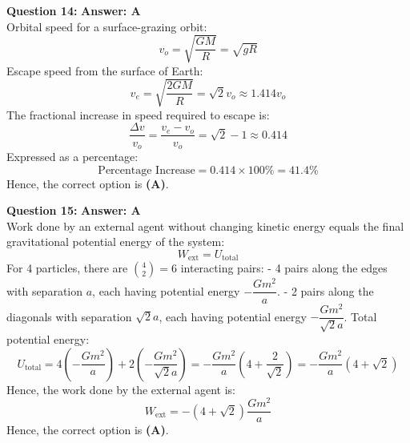 \documentclass[11pt,a4paper]{article}
\begin{document}
\begin{tcolorbox}[solbox]
  \textbf{\textcolor{primaryDark}{Question 14:}} \hfill \textbf{\textcolor{l1Green}{Answer: A}}\\
  \vspace{3pt}
  Orbital speed for a surface-grazing orbit:
$$v_o = \sqrt{\frac{GM}{R}} = \sqrt{gR}$$
\vspace{3pt}
Escape speed from the surface of Earth:
$$v_e = \sqrt{\frac{2GM}{R}} = \sqrt{2} v_o \approx 1.414 v_o$$
\vspace{3pt}
The fractional increase in speed required to escape is:
$$\frac{\Delta v}{v_o} = \frac{v_e - v_o}{v_o} = \sqrt{2} - 1 \approx 0.414$$
\vspace{3pt}
Expressed as a percentage:
$$\text{Percentage Increase} = 0.414 \times 100\% = 41.4\%$$
\vspace{3pt}
Hence, the correct option is \textbf{(A)}.
\end{tcolorbox}
\vspace{3pt}

\begin{tcolorbox}[solbox]
  \textbf{\textcolor{primaryDark}{Question 15:}} \hfill \textbf{\textcolor{l1Green}{Answer: A}}\\
  \vspace{3pt}
  Work done by an external agent without changing kinetic energy equals the final gravitational potential energy of the system:
$$W_{\text{ext}} = U_{\text{total}}$$
\vspace{3pt}
For 4 particles, there are $\binom{4}{2} = 6$ interacting pairs:
- 4 pairs along the edges with separation $a$, each having potential energy $-\dfrac{Gm^2}{a}$.
- 2 pairs along the diagonals with separation $\sqrt{2}a$, each having potential energy $-\dfrac{Gm^2}{\sqrt{2}a}$.
\vspace{3pt}
Total potential energy:
$$U_{\text{total}} = 4\left(-\frac{Gm^2}{a}\right) + 2\left(-\frac{Gm^2}{\sqrt{2}a}\right) = -\frac{Gm^2}{a}\left(4 + \frac{2}{\sqrt{2}}\right) = -\frac{Gm^2}{a}(4 + \sqrt{2})$$
\vspace{3pt}
Hence, the work done by the external agent is:
$$W_{\text{ext}} = -(4 + \sqrt{2})\frac{Gm^2}{a}$$
\vspace{3pt}
Hence, the correct option is \textbf{(A)}.
\end{tcolorbox}
\vspace{3pt}
\end{document}

